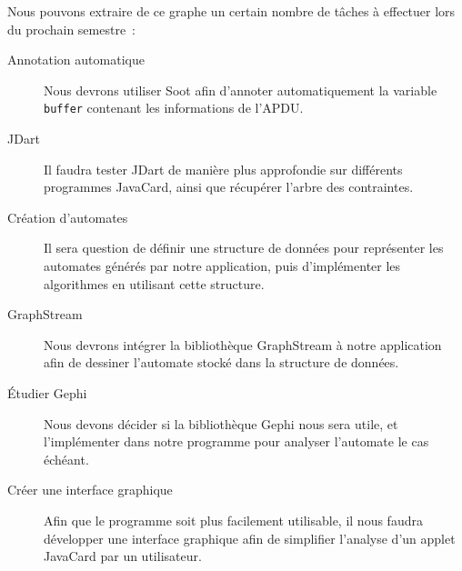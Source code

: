 Nous pouvons extraire de ce graphe un certain nombre de tâches à
effectuer lors du prochain semestre~:

\begin{description}
\item[Annotation automatique] Nous devrons utiliser Soot afin
  d'annoter automatiquement la variable \verb|buffer| contenant les
  informations de l'\gls{APDU}.
\item[JDart] Il faudra tester JDart de manière plus approfondie sur
  différents programmes JavaCard, ainsi que récupérer l'arbre des
  contraintes.
\item[Création d'automates] Il sera question de définir une structure
  de données pour représenter les automates générés par notre
  application, puis d'implémenter les algorithmes en utilisant cette
  structure.
\item[GraphStream] Nous devrons intégrer la bibliothèque GraphStream à
  notre application afin de dessiner l'automate stocké dans la
  structure de données.
\item[Étudier Gephi] Nous devons décider si la bibliothèque Gephi nous
  sera utile, et l'implémenter dans notre programme pour analyser
  l'automate le cas échéant.
\item[Créer une interface graphique] Afin que le programme soit plus
  facilement utilisable, il nous faudra développer une interface
  graphique afin de simplifier l'analyse d'un applet JavaCard par un
  utilisateur.
\end{description}
